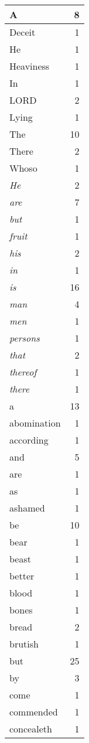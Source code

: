 \begin{center}
\begin{longtable}{l|r}
A & 8\\ \hline 
Deceit & 1\\ \hline 
He & 1\\ \hline 
Heaviness & 1\\ \hline 
In & 1\\ \hline 
LORD & 2\\ \hline 
Lying & 1\\ \hline 
The & 10\\ \hline 
There & 2\\ \hline 
Whoso & 1\\ \hline 
\emph{He} & 2\\ \hline 
\emph{are} & 7\\ \hline 
\emph{but} & 1\\ \hline 
\emph{fruit} & 1\\ \hline 
\emph{his} & 2\\ \hline 
\emph{in} & 1\\ \hline 
\emph{is} & 16\\ \hline 
\emph{man} & 4\\ \hline 
\emph{men} & 1\\ \hline 
\emph{persons} & 1\\ \hline 
\emph{that} & 2\\ \hline 
\emph{thereof} & 1\\ \hline 
\emph{there} & 1\\ \hline 
a & 13\\ \hline 
abomination & 1\\ \hline 
according & 1\\ \hline 
and & 5\\ \hline 
are & 1\\ \hline 
as & 1\\ \hline 
ashamed & 1\\ \hline 
be & 10\\ \hline 
bear & 1\\ \hline 
beast & 1\\ \hline 
better & 1\\ \hline 
blood & 1\\ \hline 
bones & 1\\ \hline 
bread & 2\\ \hline 
brutish & 1\\ \hline 
but & 25\\ \hline 
by & 3\\ \hline 
come & 1\\ \hline 
commended & 1\\ \hline 
concealeth & 1\\ \hline 

\end{longtable}
\end{center}

